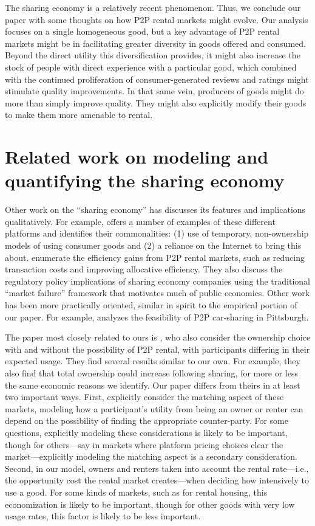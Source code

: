 \documentclass[12pt]{article}
\begin{document}
The sharing economy is a relatively recent phenomenon.
Thus, we conclude our paper with some thoughts on how P2P rental markets might evolve.
Our analysis focuses on a single homogeneous good, but a key advantage of P2P rental markets might be in facilitating greater diversity in goods offered and consumed. 
Beyond the direct utility this diversification provides, it might also increase the stock of people with direct experience with a particular good, which combined with the continued proliferation of consumer-generated reviews and ratings might stimulate quality improvements. 
In that same vein, producers of goods might do more than simply improve quality. They might also explicitly modify their goods to make them more amenable to rental.

\section{Related work on modeling and quantifying the sharing economy}
Other work on the ``sharing economy'' has discusses its features and implications qualitatively. 
For example, \cite{belk2014you} offers a number of examples of these different platforms and identifies their commonalities: (1) use of temporary, non-ownership models of using consumer goods and (2) a reliance on the Internet to bring this about. 
\cite{edelman2015efficiencies} enumerate the efficiency gains from P2P rental markets, such as reducing transaction costs and improving allocative efficiency. 
They also discuss the regulatory policy implications of sharing economy companies using the traditional ``market failure'' framework that motivates much of public economics.  
Other work has been more practically oriented, similar in spirit to the empirical portion of our paper.
For example, \cite{hampshire2011peer} analyzes the feasibility of P2P car-sharing in Pittsburgh.

The paper most closely related to ours is \cite{benjaafar2015peer},
who also consider the ownership choice with and without the possibility of P2P rental, with participants differing in their expected usage.
They find several results similar to our own.
For example, they also find that total ownership could increase following sharing, for more or less the same economic reasons we identify.
Our paper differs from theirs in at least two important ways.
First, \citeauthor{benjaafar2015peer} explicitly consider the matching aspect of these markets, modeling how a participant's utility from being an owner or renter can depend on the possibility of finding the appropriate counter-party.
For some questions, explicitly modeling these considerations is likely to be important, though for others---say in markets where platform pricing choices clear the market---explicitly modeling the matching aspect is a secondary consideration. 
Second, in our model, owners and renters taken into account the rental rate---i.e., the opportunity cost the rental market creates---when deciding how intensively to use a good. 
For some kinds of markets, such as for rental housing, this economization is likely to be important, though for other goods with very low usage rates, this factor is likely to be less important. 
\end{document}
